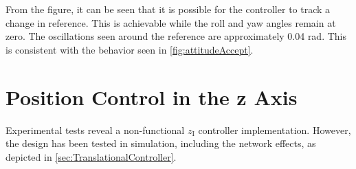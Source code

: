 From the figure, it can be seen that it is possible for the controller to track a change in reference. This is achievable while the roll and yaw angles remain at zero. The oscillations seen around the reference are approximately 0.04 rad. This is consistent with the behavior seen in \autoref{fig:attitudeAccept}.



\section{Position Control in the z Axis}

Experimental tests reveal a non-functional $z_{\mathrm{I}}$ controller implementation. However, the design has been tested in simulation, including the network effects, as depicted in \autoref{sec:TranslationalController}. 



